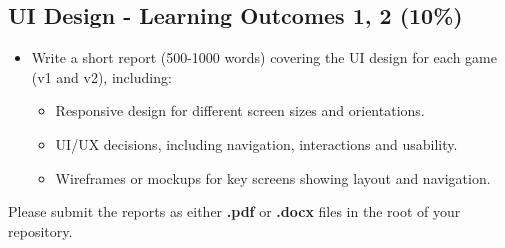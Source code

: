 \documentclass{article}
\begin{document}
\subsection*{UI Design - Learning Outcomes 1, 2 (10\%)}
\begin{itemize}
  \item Write a short report (500-1000 words) covering the UI design for each game (v1 and v2), including:
  \begin{itemize}
    \item Responsive design for different screen sizes and orientations.
    \item UI/UX decisions, including navigation, interactions and usability.
    \item Wireframes or mockups for key screens showing layout and navigation.
  \end{itemize}
\end{itemize}

Please submit the reports as either \textbf{.pdf} or \textbf{.docx} files in the root of your repository.
\end{document}
